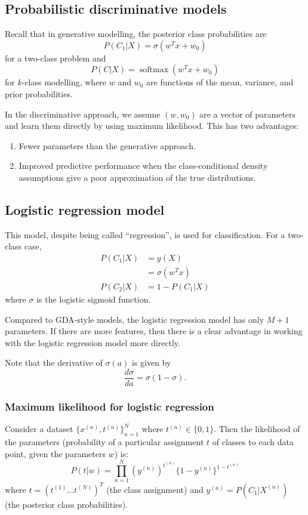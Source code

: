 \documentclass[a4paper,12pt]{article}
\DeclareMathOperator*{\softmax}{softmax}
\begin{document}
\subsection{Probabilistic discriminative models}

Recall that in generative modelling, the posterior class probabilities are 
$$P(C_1|X) = \sigma(w^Tx + w_0)$$
for a two-class problem and
$$P(C|X) = \softmax(w^Tx + w_0)$$
for $k$-class modelling, where $w$ and $w_0$ are functions of the mean, variance, and prior probabilities. 

In the discriminative approach, we assume $(w, w_0)$ are a vector of parameters and learn them directly by using maximum likelihood. This has two advantages: 
\begin{enumerate}
\item
Fewer parameters than the generative approach.
\item
Improved predictive performance when the class-conditional density assumptions give a poor approximation of the true distributions. 
\end{enumerate}

\subsection{Logistic regression model}

This model, despite being called ``regression'', is used for classification. For a two-class case, 
\begin{align*}
P(C_1|X) &= y(X) \\
		 &= \sigma(w^T x) \\
P(C_2|X) &= 1 - P(C_1|X) 
\end{align*}
where $\sigma$ is the logistic sigmoid function. 

Compared to GDA-style models, the logistic regression model has only $M+1$ parameters. If there are more features, then there is a clear advantage in working with the logistic regression model more directly. 

Note that the derivative of $\sigma(a)$ is given by 
$$\frac{d\sigma}{da} = \sigma(1-\sigma).$$

\subsubsection{Maximum likelihood for logistic regression}

Consider a dataset $\{x^{(n)}, t^{(n)}\}_{n=1}^N$ where $t^{(n)} \in \{0, 1\}$. Then the likelihood of the parameters (probability of a particular assignment $t$ of classes to each data point, given the parameters $w$) is: 
$$P(t|w) = \prod_{n=1}^N (y^{(n)})^{t^{(n)}} \{1 - y^{(n)}\}^{1-t^{(n)}}$$
where $t = (t^{(1)}...t^{(N)})^T$ (the class assignment) and $y^{(n)} = P(C_1|X^{(n)})$ (the posterior class probabilities). 
\end{document}
